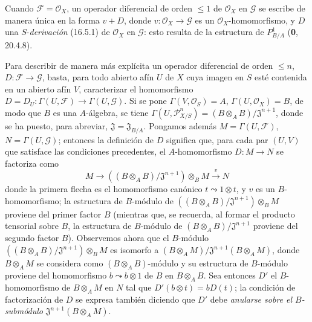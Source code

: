 Cuando $\mathscr{F}=\mathcal{O}_X$, un operador diferencial de orden
$\leq1$ de $\mathcal{O}_X$ en $\mathscr{G}$ se escribe de manera única
en la forma $v+D$, donde $v:\mathcal{O}_X\to\mathscr{G}$ es un
$\mathcal{O}_X$-homomorfismo, y $D$ una $S$-\emph{derivación} (16.5.1) de
$\mathcal{O}_X$ en $\mathscr{G}$: esto resulta de la estructura de
$P_{B/A}^1$ (\textbf 0, 20.4.8).

\begin{env}[16.8.2]
\label{IV.16.8.2}
Para describir de manera más explícita un operador diferencial de orden
$\leq n$, $D:\mathscr{F}\to\mathscr{G}$, basta, para todo abierto afín
$U$ de $X$ cuya imagen en $S$ esté contenida en un abierto afín $V$,
caracterizar el homomorfismo
$D=D_U:\Gamma(U,\mathscr{F})\to\Gamma(U,\mathscr{G})$. Si se pone
$\Gamma(V,\mathcal{O}_S)=A$, $\Gamma(U,\mathcal{O}_X)=B$, de modo que $B$
es una $A$-álgebra, se tiene
$\Gamma(U,\mathscr{P}_{X/S}^n)=(B\otimes_A B)/\mathfrak{J}^{n+1}$,
donde se ha puesto, para abreviar, $\mathfrak{J}=\mathfrak{J}_{B/A}$.
Pongamos además $M=\Gamma(U,\mathscr{F})$, $N=\Gamma(U,\mathscr{G})$;
entonces la definición de $D$ significa que, para cada par $(U,V)$ que
satisface las condiciones precedentes, el $A$-homomorfismo $D:M\to N$ se
factoriza como
\[
  M\longrightarrow
  ((B\otimes_A B)/\mathfrak{J}^{n+1})\otimes_B M
  \xrightarrow{v}N
\]
donde la primera flecha es el homomorfismo canónico $t\leadsto1\otimes t$, y
$v$ es un $B$-homomorfismo; la estructura de $B$-módulo de
$((B\otimes_A B)/\mathfrak{J}^{n+1})\otimes_B M$ proviene del primer
factor $B$ (mientras que, se recuerda, al formar el producto tensorial
sobre $B$, la estructura de $B$-módulo de
$(B\otimes_A B)/\mathfrak{J}^{n+1}$ proviene del segundo factor $B$).
Observemos ahora que el $B$-módulo
$((B\otimes_A B)/\mathfrak{J}^{n+1})\otimes_B M$ es isomorfo a
$(B\otimes_A M)/\mathfrak{J}^{n+1}(B\otimes_A M)$, donde $B\otimes_A M$ se
considera como $(B\otimes_A B)$-módulo y su estructura de $B$-módulo
proviene del homomorfismo $b\leadsto b\otimes1$ de $B$ en $B\otimes_A B$.
Sea entonces $D'$ el $B$-homomorfismo de $B\otimes_A M$ en $N$ tal que
$D'(b\otimes t)=bD(t)$; la condición de factorización de $D$ se expresa
también diciendo que $D'$ debe \emph{anularse sobre el $B$-submódulo}
$\mathfrak{J}^{n+1}(B\otimes_A M)$.
\end{env}

